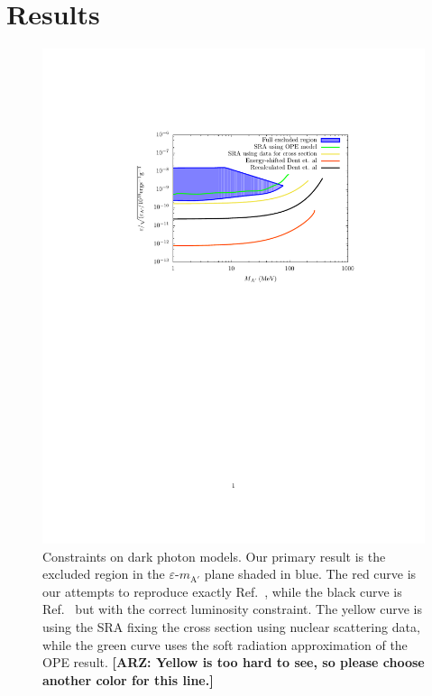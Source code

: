 \documentclass[nofootinbib,prd,superscriptaddress,twocolumn]{revtex4}
\newcommand{\arz}[1]{{{\bf{\color{BrickRed}[ARZ: #1]}}}}
\begin{document}
\section{Results}
\label{section:results}



\begin{figure}[th]
\includegraphics[width=14cm]{compiledbounds_edited.pdf}
\caption{
Constraints on dark photon models. Our primary result is the excluded region 
in the $\varepsilon$-$m_{\mathrm{A'}}$ plane shaded in blue. The red curve is our attempts to reproduce exactly Ref.~\cite{dent_etal12}, while the black curve is Ref.~\cite{dent_etal12} but with the correct luminosity constraint.  The yellow curve is using the SRA fixing the cross section using nuclear scattering data, while the green curve uses the soft radiation approximation of the OPE result.  
\arz{Yellow is too hard to see, so please choose another color for this line.} 
}
\label{fig:constraint}
\end{figure}
\end{document}
